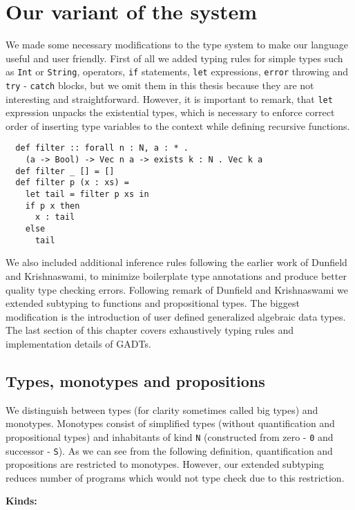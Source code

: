 \documentclass[declaration,shortabstract,english]{iithesis}
\begin{document}
\section{Our variant of the system}
We made some necessary modifications to the type system to make our language useful and user friendly.
First of all we added typing rules for simple types such as
\verb+Int+ or \verb+String+, operators, \verb+if+ statements, \verb+let+ expressions,
\verb+error+ throwing and \verb+try+ - \verb+catch+ blocks, but we omit them in this thesis because
they are not interesting and straightforward. However, it is important to remark, that \verb+let+ expression unpacks the
existential types, which is necessary to enforce correct order of inserting type variables to the context while defining
recursive functions.
\begin{verbatim}
  def filter :: forall n : N, a : * .
    (a -> Bool) -> Vec n a -> exists k : N . Vec k a
  def filter _ [] = []
  def filter p (x : xs) =
    let tail = filter p xs in
    if p x then
      x : tail
    else
      tail
\end{verbatim}
We also included additional inference rules following the earlier work of Dunfield and Krishnaswami\cite{Dunfield13:bidir},
to minimize boilerplate type annotations and produce better quality type checking errors. Following
remark of Dunfield and Krishnaswami\cite{gadt-popl19} we extended subtyping to functions and propositional types.
The biggest modification is the introduction of user defined generalized algebraic data types. The last section
of this chapter covers exhaustively typing rules and implementation details of GADTs. %

\subsection*{Types, monotypes and propositions}

We distinguish between types (for clarity sometimes called big types) and monotypes.
Monotypes consist of simplified types (without quantification and propositional types) and
inhabitants of kind \verb+N+ (constructed from zero - \verb+0+ and successor - \verb+S+).
As we can see from the following definition, quantification and propositions are restricted to monotypes.
However, our extended subtyping reduces number of programs which would not type check due to this restriction.

\textbf{Kinds:}
\end{document}
